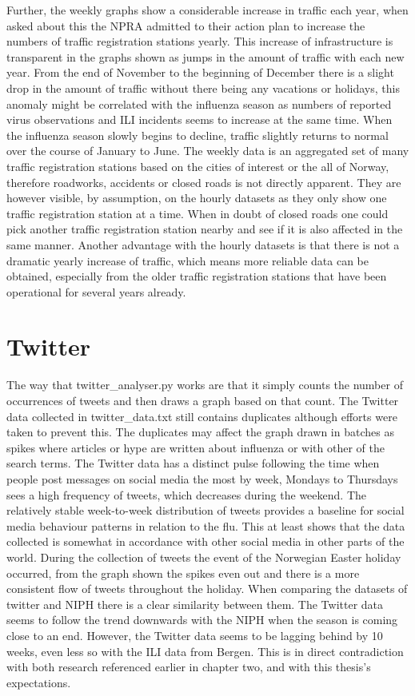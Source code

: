 Further, the weekly graphs show a considerable increase in traffic each year, when asked about this the NPRA admitted to their action plan to increase the numbers of traffic registration stations yearly. This increase of infrastructure is transparent in the graphs shown as jumps in the amount of traffic with each new year. From the end of November to the beginning of December there is a slight drop in the amount of traffic without there being any vacations or holidays, this anomaly might be correlated with the influenza season as numbers of reported virus observations and ILI incidents seems to increase at the same time. When the influenza season slowly begins to decline, traffic slightly returns to normal over the course of January to June.
The weekly data is an aggregated set of many traffic registration stations based on the cities of interest or the all of Norway, therefore roadworks, accidents or closed roads is not directly apparent. They are however visible, by assumption, on the hourly datasets as they only show one traffic registration station at a time. When in doubt of closed roads one could pick another traffic registration station nearby and see if it is also affected in the same manner. Another advantage with the hourly datasets is that there is not a dramatic yearly increase of traffic, which means more reliable data can be obtained, especially from the older traffic registration stations that have been operational for several years already.




\section{Twitter}
The way that twitter\_analyser.py works are that it simply counts the number of occurrences of tweets and then draws a graph based on that count. The Twitter data collected in twitter\_data.txt still contains duplicates although efforts were taken to prevent this. The duplicates may affect the graph drawn in batches as spikes where articles or hype are written about influenza or with other of the search terms. The Twitter data has a distinct pulse following the time when people post messages on social media the most by week\cite{socialTrend}, Mondays to Thursdays sees a high frequency of tweets, which decreases during the weekend. The relatively stable week-to-week distribution of tweets provides a baseline for social media behaviour patterns in relation to the flu. This at least shows that the data collected is somewhat in accordance with other social media in other parts of the world. During the collection of tweets the event of the Norwegian Easter holiday occurred, from the graph shown the spikes even out and there is a more consistent flow of tweets throughout the holiday.
When comparing the datasets of twitter and NIPH there is a clear similarity between them. The Twitter data seems to follow the trend downwards with the NIPH when the season is coming close to an end. However, the Twitter data seems to be lagging behind by 10 weeks, even less so with the ILI data from Bergen. This is in direct contradiction with both research referenced earlier in chapter two, and with this thesis's expectations.





